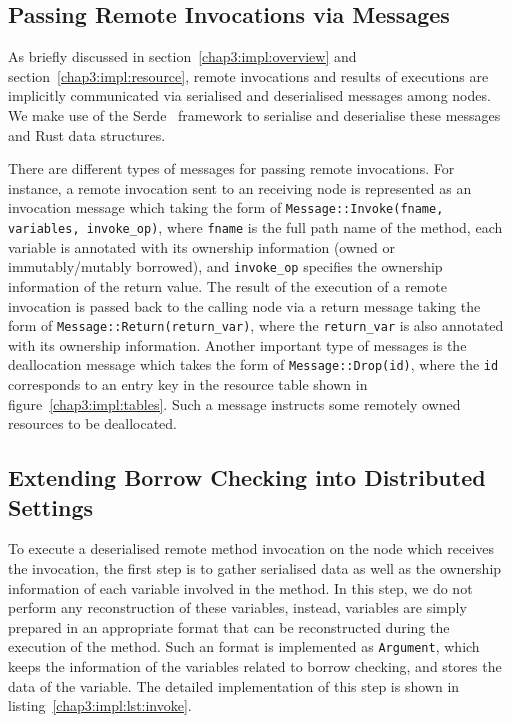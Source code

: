 \subsection{Passing Remote Invocations via Messages}
\label{impl:message}
As briefly discussed in section~\ref{chap3:impl:overview} and section~\ref{chap3:impl:resource}, remote invocations and results of executions are implicitly communicated via serialised and deserialised messages among nodes. We make use of the Serde~\citep{serde} framework to serialise and deserialise these messages and Rust data structures.

There are different types of messages for passing remote invocations. For instance, a remote invocation sent to an receiving node is represented as an invocation message which taking the form of \texttt{Message::Invoke(fname, variables, invoke\_op)}, where \texttt{fname} is the full path name of the method, each variable is annotated with its ownership information (owned or immutably/mutably borrowed), and \texttt{invoke\_op} specifies the ownership information of the return value. The result of the execution of a remote invocation is passed back to the calling node via a return message taking the form of \texttt{Message::Return(return\_var)}, where the \texttt{return\_var} is also annotated with its ownership information. Another important type of messages is the deallocation message which takes the form of \texttt{Message::Drop(id)}, where the \texttt{id} corresponds to an entry key in the resource table shown in figure~\ref{chap3:impl:tables}. Such a message instructs some remotely owned resources to be deallocated.

\subsection{Extending Borrow Checking into Distributed Settings}
\label{chap3:impl:borrow}
To execute a deserialised remote method invocation on the node which receives the invocation, the first step is to gather serialised data as well as the ownership information of each variable involved in the method. In this step, we do not perform any reconstruction of these variables, instead, variables are simply prepared in an appropriate format that can be reconstructed during the execution of the method. Such an format is implemented as \texttt{Argument}, which keeps the information of the variables related to borrow checking, and stores the data of the variable. The detailed implementation of this step is shown in listing~\ref{chap3:impl:lst:invoke}.

